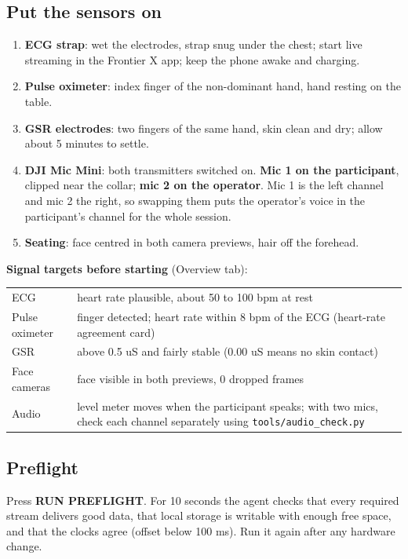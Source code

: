 \documentclass[11pt,a4paper]{article}
\newcommand{\ui}[1]{\textsf{\textbf{#1}}}
\begin{document}
\subsection{Put the sensors on}
\begin{enumerate}
  \item \textbf{ECG strap}: wet the electrodes, strap snug under the chest; start live streaming in the Frontier X
    app; keep the phone awake and charging.
  \item \textbf{Pulse oximeter}: index finger of the non-dominant hand, hand resting on the table.
  \item \textbf{GSR electrodes}: two fingers of the same hand, skin clean and dry; allow about 5 minutes to settle.
  \item \textbf{DJI Mic Mini}: both transmitters switched on. \textbf{Mic 1 on the participant}, clipped near the
    collar; \textbf{mic 2 on the operator}. Mic 1 is the left channel and mic 2 the right, so swapping them puts the
    operator's voice in the participant's channel for the whole session.
  \item \textbf{Seating}: face centred in both camera previews, hair off the forehead.
\end{enumerate}

\textbf{Signal targets before starting} (Overview tab):
\begin{tabularx}{\linewidth}{@{}lX@{}}
\toprule
ECG & heart rate plausible, about 50 to 100 bpm at rest \\
Pulse oximeter & finger detected; heart rate within 8 bpm of the ECG (heart-rate agreement card) \\
GSR & above 0.5 uS and fairly stable (0.00 uS means no skin contact) \\
Face cameras & face visible in both previews, 0 dropped frames \\
Audio & level meter moves when the participant speaks; with two mics, check each channel separately using \texttt{tools/audio\_check.py} \\
\bottomrule
\end{tabularx}

\subsection{Preflight}
Press \ui{RUN PREFLIGHT}. For 10 seconds the agent checks that every required stream delivers good data, that local
storage is writable with enough free space, and that the clocks agree (offset below 100 ms). Run it again after any
hardware change.
\end{document}
